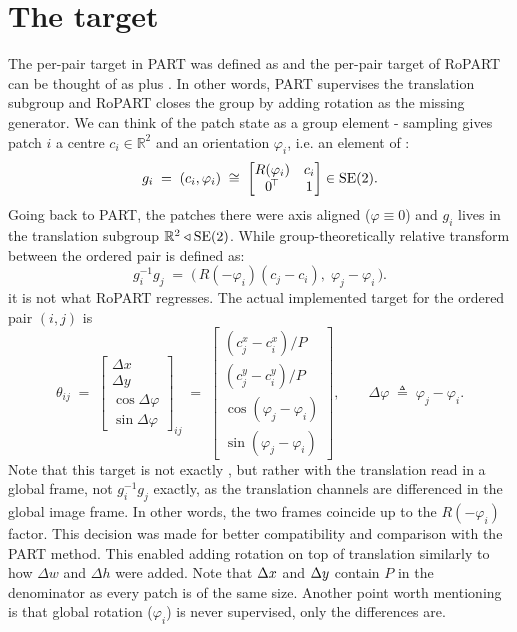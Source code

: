 \documentclass[final_report.tex]{subfiles}
\begin{document}
\section{The \texorpdfstring{\SEtwo}{SE(2)} target}\label{sec:se2-target}
The per-pair target in PART was defined as \dxy{} and the per-pair target of RoPART can be thought of as \dxy{} plus \dphi{}. In other words, PART supervises the translation subgroup and RoPART closes the group by adding rotation as the missing generator.
We can think of the patch state as a group element - sampling gives patch $i$ a centre $c_i \in \mathbb{R}^2$ and an orientation $\varphi_i$, i.e. an element of \SEtwo{}:
\begin{equation}\label{eq:se2-element}
  g_i \;=\; (c_i, \varphi_i) \;\cong\;
  \begin{bmatrix} R(\varphi_i) & c_i \\ 0^{\!\top} & 1 \end{bmatrix} \in \mathrm{SE}(2) .
\end{equation}
Going back to PART, the patches there were axis aligned ($\varphi \equiv 0$) and $g_i$ lives in the translation subgroup $\mathbb{R}^2 \triangleleft \mathrm{SE}(2)$.
While group-theoretically relative transform between the ordered pair is defined as:
\begin{equation}\label{eq:se2-relative}
  g_i^{-1} g_j \;=\; \bigl(\, R(-\varphi_i)(c_j - c_i),\; \varphi_j - \varphi_i \,\bigr).
\end{equation}
it is not what RoPART regresses. The actual implemented target for the ordered pair $(i,j)$ is
\begin{equation}\label{eq:target-ropart}
  \theta_{ij}
  \;=\;
  \begin{bmatrix}
    \Delta x \\ \Delta y \\ \cos\Delta\varphi \\ \sin\Delta\varphi
  \end{bmatrix}_{ij}
  \;=\;
  \begin{bmatrix}
    (c^{x}_{j} - c^{x}_{i}) / P \\[2pt]
    (c^{y}_{j} - c^{y}_{i}) / P \\[2pt]
    \cos(\varphi_j - \varphi_i) \\[2pt]
    \sin(\varphi_j - \varphi_i)
  \end{bmatrix},
  \qquad
  \Delta\varphi \;\triangleq\; \varphi_j - \varphi_i .
\end{equation}
Note that this target is not exactly \SEtwo, but rather \SEtwo{} with the translation read in a global frame, not $g_i^{-1}g_j$ exactly, as the translation channels are differenced in the global image frame. In other words, the two frames coincide up to the $R(-\varphi_i)$ factor. This decision was made for better compatibility and comparison with the PART method. This enabled adding rotation on top of translation similarly to how $\Delta w$ and $\Delta h$ were added. Note that $\Delta x$ and $\Delta y$ contain $P$ in the denominator as every patch is of the same size. Another point worth mentioning is that global rotation ($\varphi_i$) is never supervised, only the differences are. 
\end{document}
